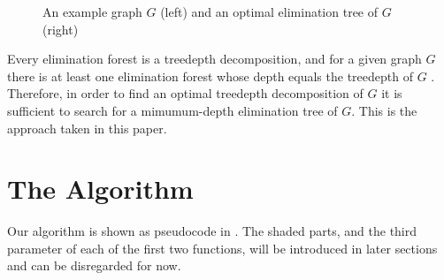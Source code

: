 {\begin{figure}[htb]

      \caption{An example graph $G$ (left) and an optimal elimination tree of $G$ (right)}
      \label{fig:graph}
    \end{figure}

    Every elimination forest is a treedepth decomposition, and for a given graph $G$ there is
    at least one elimination forest whose depth equals the treedepth of $G$
    \cite{DBLP:books/daglib/0030491,mujika2015about}.
    Therefore, in order to find an optimal treedepth decomposition of $G$ it is sufficient to search
    for a mimumum-depth elimination tree of $G$.  This is the approach taken in this paper.

    \section{The Algorithm}\label{sec:algorithm}

    Our algorithm is shown as pseudocode in .  The shaded parts, and the third
    parameter of each of the first two functions, will be introduced in later sections and can be disregarded for now.

    {
    \begin{algorithm}[h!]
     \footnotesize
    \DontPrintSemicolon
    \newcommand\SimpleLowerBound{\FuncSty{simple\_lower\_bound}}
    \newcommand\PathLowerBound{\FuncSty{can\_prune\_by\_path\_lower\_bound}}

\end{algorithm}}}
